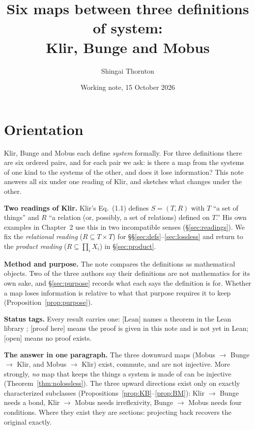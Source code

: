 \documentclass[11pt]{article}
\title{Six maps between three definitions of system:\\ Klir, Bunge and Mobus}
\author{Shingai Thornton}
\date{Working note, 15 October 2026}
\theoremstyle{definition}
\theoremstyle{remark}
\begin{document}
\maketitle

\section*{Orientation}

Klir, Bunge and Mobus each define \emph{system} formally. For three definitions there are six ordered pairs, and for each pair we ask: is there a map from the systems of one kind to the systems of the other, and does it lose information? This note answers all six under one reading of Klir, and sketches what changes under the other.

\textbf{Two readings of Klir.} Klir's Eq.~(1.1) \cite{klir2001} defines $S=(T,R)$ with $T$ ``a set of things'' and $R$ ``a relation (or, possibly, a set of relations) defined on $T$.'' His own examples in Chapter~2 use this in two incompatible senses (\S\ref{sec:readings}). We fix the \emph{relational reading} ($R\subseteq T\times T$) for \S\S\ref{sec:defs}--\ref{sec:lossless} and return to the \emph{product reading} ($R\subseteq\prod_i X_i$) in \S\ref{sec:product}.

\textbf{Method and purpose.} The note compares the definitions as mathematical objects. Two of the three authors say their definitions are not mathematics for its own sake, and \S\ref{sec:purpose} records what each says the definition is for. Whether a map loses information is relative to what that purpose requires it to keep (Proposition~\ref{prop:purpose}).

\textbf{Status tags.} Every result carries one: \textsf{[Lean]} names a theorem in the Lean library \cite{ssf}; \textsf{[proof here]} means the proof is given in this note and is not yet in Lean; \textsf{[open]} means no proof exists.

\textbf{The answer in one paragraph.} The three downward maps (Mobus $\to$ Bunge $\to$ Klir, and Mobus $\to$ Klir) exist, commute, and are not injective. More strongly, \emph{no} map that keeps the things a system is made of can be injective (Theorem~\ref{thm:nolossless}). The three upward directions exist only on exactly characterized subclasses (Propositions~\ref{prop:KB}--\ref{prop:BM}): Klir $\to$ Bunge needs a bond, Klir $\to$ Mobus needs irreflexivity, Bunge $\to$ Mobus needs four conditions. Where they exist they are sections: projecting back recovers the original exactly.
\end{document}
